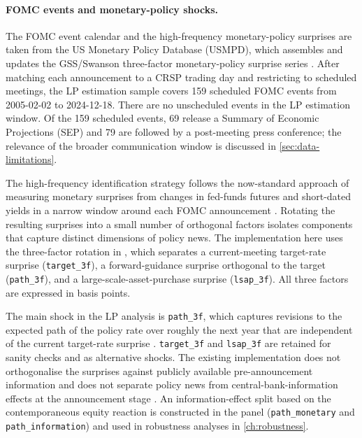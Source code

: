 \paragraph{FOMC events and monetary-policy shocks.} The FOMC event calendar and the high-frequency monetary-policy surprises are taken from the US Monetary Policy Database (USMPD), which assembles and updates the GSS/Swanson three-factor monetary-policy surprise series \citep{gurkaynakSackSwanson2005, swanson2021, acostaEtAl2025}. After matching each announcement to a CRSP trading day and restricting to scheduled meetings, the LP estimation sample covers 159 scheduled FOMC events from \mbox{2005-02-02} to \mbox{2024-12-18}. There are no unscheduled events in the LP estimation window. Of the 159 scheduled events, 69 release a Summary of Economic Projections (SEP) and 79 are followed by a post-meeting press conference; the relevance of the broader communication window is discussed in \cref{sec:data-limitations}.

The high-frequency identification strategy follows the now-standard approach of measuring monetary surprises from changes in fed-funds futures and short-dated yields in a narrow window around each FOMC announcement \citep{bernankeKuttner2005, rigobonSack2004, nakamuraSteinsson2018}. Rotating the resulting surprises into a small number of orthogonal factors isolates components that capture distinct dimensions of policy news. The implementation here uses the three-factor rotation in \citet{swanson2021}, which separates a current-meeting target-rate surprise (\texttt{target\_3f}), a forward-guidance surprise orthogonal to the target (\texttt{path\_3f}), and a large-scale-asset-purchase surprise (\texttt{lsap\_3f}). All three factors are expressed in basis points.

The main shock in the LP analysis is \texttt{path\_3f}, which captures revisions to the expected path of the policy rate over roughly the next year that are independent of the current target-rate surprise \citep{gurkaynakSackSwanson2005, swanson2021, bauerSwanson2023}. \texttt{target\_3f} and \texttt{lsap\_3f} are retained for sanity checks and as alternative shocks. The existing implementation does not orthogonalise the surprises against publicly available pre-announcement information \citep[][on the case for such orthogonalisation]{bauerSwanson2023} and does not separate policy news from central-bank-information effects at the announcement stage \citep[][]{jarocinskiKaradi2020, mirandaAgrippinoRicco2021, cieslakSchrimpf2019}. An information-effect split based on the contemporaneous equity reaction is constructed in the panel (\texttt{path\_monetary} and \texttt{path\_information}) and used in robustness analyses in \cref{ch:robustness}.

